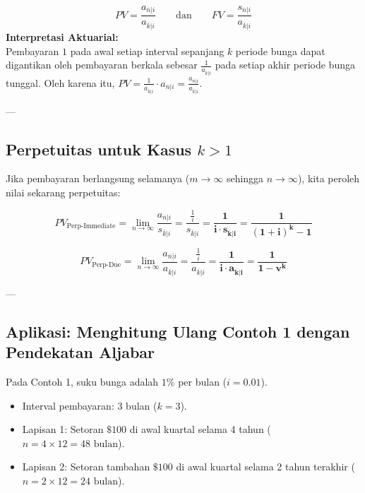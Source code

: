 \documentclass[11pt,a4paper]{article}
\begin{document}
\begin{definitionbox}
\begin{equation}
    PV = \frac{a_{\overline{n}|i}}{a_{\overline{k}|i}} \qquad \text{dan} \qquad FV = \frac{s_{\overline{n}|i}}{a_{\overline{k}|i}}
\end{equation}
\textbf{Interpretasi Aktuarial:}\\
Pembayaran $1$ pada awal setiap interval sepanjang $k$ periode bunga dapat digantikan oleh pembayaran berkala sebesar $\frac{1}{a_{\overline{k}|i}}$ pada setiap akhir periode bunga tunggal. Oleh karena itu, $PV = \frac{1}{a_{\overline{k}|i}} \cdot a_{\overline{n}|i} = \frac{a_{\overline{n}|i}}{a_{\overline{k}|i}}$.
\end{definitionbox}

---

\subsection{Perpetuitas untuk Kasus \texorpdfstring{$k > 1$}{k > 1}}

Jika pembayaran berlangsung selamanya ($m \to \infty$ sehingga $n \to \infty$), kita peroleh nilai sekarang perpetuitas:

\begin{equation}
    PV_{\text{Perp-Immediate}} = \lim_{n \to \infty} \frac{a_{\overline{n}|i}}{s_{\overline{k}|i}} = \frac{\frac{1}{i}}{s_{\overline{k}|i}} = \mathbf{\frac{1}{i \cdot s_{\overline{k}|i}} = \frac{1}{(1+i)^k - 1}}
\end{equation}

\begin{equation}
    PV_{\text{Perp-Due}} = \lim_{n \to \infty} \frac{a_{\overline{n}|i}}{a_{\overline{k}|i}} = \frac{\frac{1}{i}}{a_{\overline{k}|i}} = \mathbf{\frac{1}{i \cdot a_{\overline{k}|i}} = \frac{1}{1 - v^k}}
\end{equation}

---

\subsection{Aplikasi: Menghitung Ulang Contoh 1 dengan Pendekatan Aljabar}

\begin{examplebox}
Pada Contoh 1, suku bunga adalah $1\%$ per bulan ($i = 0.01$).
\begin{itemize}
    \item Interval pembayaran: 3 bulan ($k = 3$).
    \item Lapisan 1: Setoran $\$100$ di awal kuartal selama 4 tahun ($n = 4 \times 12 = 48\text{ bulan}$).
    \item Lapisan 2: Setoran tambahan $\$100$ di awal kuartal selama 2 tahun terakhir ($n = 2 \times 12 = 24\text{ bulan}$).
\end{itemize}
\end{examplebox}
\end{document}
